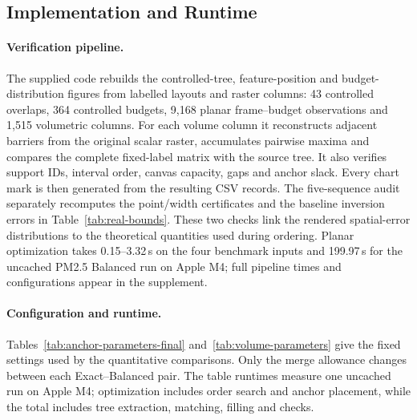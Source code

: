 \subsection{Implementation and Runtime}
\paragraph{Verification pipeline.} The supplied code rebuilds the controlled-tree, feature-position and budget-distribution figures from labelled layouts and raster columns: 43 controlled overlaps, 364 controlled budgets, 9,168 planar frame--budget observations and 1,515 volumetric columns. For each volume column it reconstructs adjacent barriers from the original scalar raster, accumulates pairwise maxima and compares the complete fixed-label matrix with the source tree. It also verifies support IDs, interval order, canvas capacity, gaps and anchor slack. Every chart mark is then generated from the resulting CSV records. The five-sequence audit separately recomputes the point/width certificates and the baseline inversion errors in Table~\ref{tab:real-bounds}. These two checks link the rendered spatial-error distributions to the theoretical quantities used during ordering. Planar optimization takes 0.15--3.32\,s on the four benchmark inputs and 199.97\,s for the uncached PM2.5 Balanced run on Apple M4; full pipeline times and configurations appear in the supplement.

\paragraph{Configuration and runtime.} Tables~\ref{tab:anchor-parameters-final} and~\ref{tab:volume-parameters} give the fixed settings used by the quantitative comparisons. Only the merge allowance changes between each Exact--Balanced pair. The table runtimes measure one uncached run on Apple M4; optimization includes order search and anchor placement, while the total includes tree extraction, matching, filling and checks.


